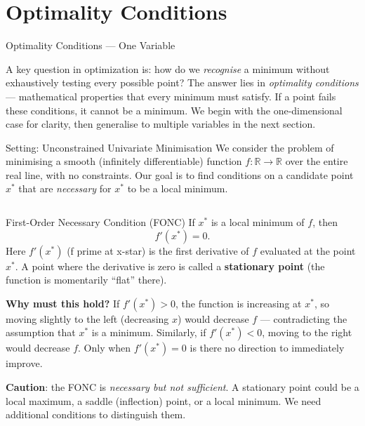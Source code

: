 \documentclass[aspectratio=169,10pt]{beamer}
\newcommand{\R}{\mathbb{R}}
\begin{document}
\section{Optimality Conditions}

\begin{frame}[allowframebreaks]{Optimality Conditions --- One Variable}

A key question in optimization is: how do we \emph{recognise} a minimum without
exhaustively testing every possible point?  The answer lies in
\emph{optimality conditions} --- mathematical properties that every minimum must
satisfy.  If a point fails these conditions, it cannot be a minimum.
We begin with the one-dimensional case for clarity, then generalise to
multiple variables in the next section.

  \begin{block}{Setting: Unconstrained Univariate Minimisation}
    We consider the problem of minimising a smooth (infinitely differentiable)
    function $f : \R \to \R$ over the entire real line, with no constraints.
    Our goal is to find conditions on a candidate point $x^*$ that are
    \emph{necessary} for $x^*$ to be a local minimum.
  \end{block}

  \begin{columns}[T]

      \begin{alertblock}{First-Order Necessary Condition (FONC)}
        If $x^*$ is a local minimum of $f$, then
        \[
          f'(x^*) = 0.
        \]
        Here $f'(x^*)$ (f prime at x-star) is the first derivative of $f$
        evaluated at the point $x^*$.  A point where the derivative is zero
        is called a \textbf{stationary point} (the function is momentarily
        ``flat'' there).

        \medskip
        \textbf{Why must this hold?}  If $f'(x^*) > 0$, the function is
        increasing at $x^*$, so moving slightly to the left (decreasing $x$)
        would decrease $f$ --- contradicting the assumption that $x^*$ is a
        minimum.  Similarly, if $f'(x^*) < 0$, moving to the right would
        decrease $f$.  Only when $f'(x^*) = 0$ is there no direction to
        immediately improve.

        \medskip
        \textbf{Caution}: the FONC is \emph{necessary but not sufficient}.
        A stationary point could be a local maximum, a saddle (inflection) point,
        or a local minimum.  We need additional conditions to distinguish them.
      \end{alertblock}


\end{columns}
\end{frame}
\end{document}
